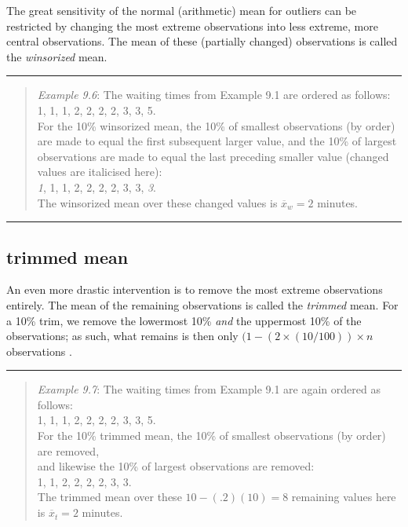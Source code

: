 \documentclass[
]{book}
\begin{document}
The great sensitivity of the normal (arithmetic) mean for
outliers can be restricted by changing the most extreme observations
into less extreme, more central observations. The
mean of these (partially changed) observations is called the
\emph{winsorized} mean.

\begin{center}\rule{0.5\linewidth}{0.5pt}\end{center}

\begin{quote}
\emph{Example 9.6}: The waiting times from Example 9.1
are ordered as follows:\\
1, 1, 1, 2, 2, 2, 2, 3, 3, 5.\\
For the 10\% winsorized mean, the 10\% of smallest observations (by
order) are made to equal the first subsequent larger value, and
the 10\% of largest observations are made to equal the last
preceding smaller value (changed values are italicised here):\\
\emph{1}, 1, 1, 2, 2, 2, 2, 3, 3, \emph{3}.\\
The winsorized mean over these changed values is
\(\overline{x}_w=2\) minutes.
\end{quote}

\begin{center}\rule{0.5\linewidth}{0.5pt}\end{center}

\subsection{trimmed mean}\label{trimmed-mean}

An even more drastic intervention is to remove the most extreme observations
entirely. The mean of the remaining observations is called
the \emph{trimmed} mean. For a 10\% trim, we remove the lowermost 10\% \emph{and} the
uppermost 10\% of the observations;
as such, what remains is then only \((1- (2 \times (10/100))\times n\)
observations \citep{Wilcox12}.

\begin{center}\rule{0.5\linewidth}{0.5pt}\end{center}

\begin{quote}
\emph{Example 9.7}: The waiting times from Example 9.1
are again ordered as follows:\\
1, 1, 1, 2, 2, 2, 2, 3, 3, 5.\\
For the 10\% trimmed mean, the 10\% of smallest observations (by order) are removed,\\
and likewise the 10\% of largest observations
are removed:\\
1, 1, 2, 2, 2, 2, 3, 3.\\
The trimmed mean over these \(10-(.2)(10)=8\) remaining values here
is \(\overline{x}_t=2\) minutes.
\end{quote}
\end{document}
